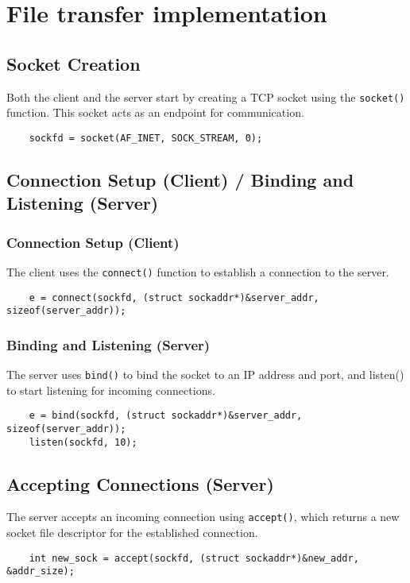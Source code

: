 \section{File transfer implementation}

\subsection{Socket Creation}

Both the client and the server start by creating a TCP socket using the \verb|socket()| function. This socket acts as an endpoint for communication.
\begin{verbatim}
    sockfd = socket(AF_INET, SOCK_STREAM, 0);
\end{verbatim}

\subsection{Connection Setup (Client) / Binding and Listening (Server)}

\subsubsection{Connection Setup (Client)}

The client uses the \verb|connect()| function to establish a connection to the server.
\begin{verbatim}
    e = connect(sockfd, (struct sockaddr*)&server_addr, sizeof(server_addr));
\end{verbatim}

\subsubsection{Binding and Listening (Server)}

The server uses \verb|bind()| to bind the socket to an IP address and port, and listen() to start listening for incoming connections.
\begin{verbatim}
    e = bind(sockfd, (struct sockaddr*)&server_addr, sizeof(server_addr));
    listen(sockfd, 10);
\end{verbatim}

\subsection{Accepting Connections (Server)}

The server accepts an incoming connection using \verb|accept()|, which returns a new socket file descriptor for the established connection.
\begin{verbatim}
    int new_sock = accept(sockfd, (struct sockaddr*)&new_addr, &addr_size);
\end{verbatim}

